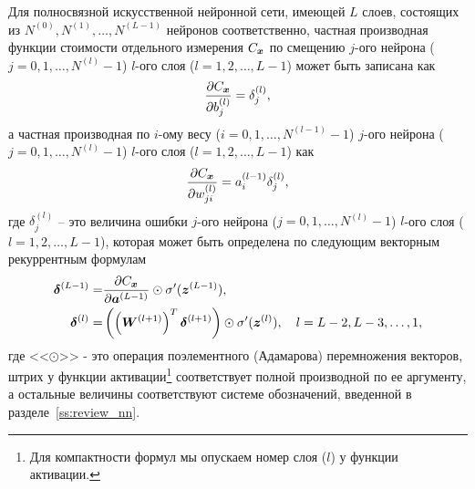 \documentclass[a4paper,12pt,russian]{article} %
\begin{document}
\begin{theorem} \label{th:backprop}
	Для полносвязной искусственной нейронной сети, имеющей $L$ слоев, состоящих из $N^{(0)}, N^{(1)}, \ldots, N^{(L-1)}$ нейронов соответственно, частная производная функции стоимости отдельного измерения $C_{\bm{x}}$ по смещению $j$-ого нейрона ($j = 0, 1, \ldots, N^{(l)}-1$) $l$-ого слоя ($l = 1, 2, \ldots, L-1$) может быть записана как
	\begin{equation} \label{ss:review_nnlearning_C_grad_b}
		\frac{\partial C_{\bm{x}}}{\partial b_j^{(l)}} = \delta_j^{(l)},
	\end{equation}
	а частная производная по $i$-ому весу ($i = 0, 1, \ldots, N^{(l-1)}-1$) $j$-ого нейрона ($j = 0, 1, \ldots, N^{(l)}-1$) $l$-ого слоя ($l = 1, 2, \ldots, L-1$) как
	\begin{equation} \label{ss:review_nnlearning_C_grad_w}
		\frac{\partial C_{\bm{x}}}{\partial w_{ji}^{(l)}} = a_i^{(l-1)} \delta_j^{(l)},
	\end{equation}
	где $\delta_j^{(l)}$ -- это величина ошибки $j$-ого нейрона ($j = 0, 1, \ldots, N^{(l)}-1$) $l$-ого слоя ($l = 1, 2, \ldots, L-1$), которая может быть определена по следующим векторным рекуррентным формулам
	\begin{equation} \label{ss:review_nnlearning_C_grad_delta} 
		\begin{split}	
			\bm{\delta}^{(L-1)} = &
				\frac{\partial C_{\bm{x}}}{\partial \bm{a}^{(L-1)}} \odot \sigma'(\bm{z}^{(L-1)}),
			\\
			\bm{\delta}^{(l)} =  &
				\left( \left( \bm{W}^{(l+1)} \right)^T \bm{\delta}^{(l+1)} \right) \odot \sigma'(\bm{z}^{(l)}),
			\quad
			l = L-2, L-3, \ldots, 1,
		\end{split}
	\end{equation}
	где <<$\odot$>> - это операция поэлементного (Адамарова) перемножения векторов, штрих у функции активации\footnote{
		Для компактности формул мы опускаем номер слоя ($l$) у функции активации.
	} 
	соответствует полной производной по ее аргументу, а остальные величины соответствуют системе обозначений, введенной в разделе~\ref{ss:review_nn}.
\end{theorem}
\end{document}
